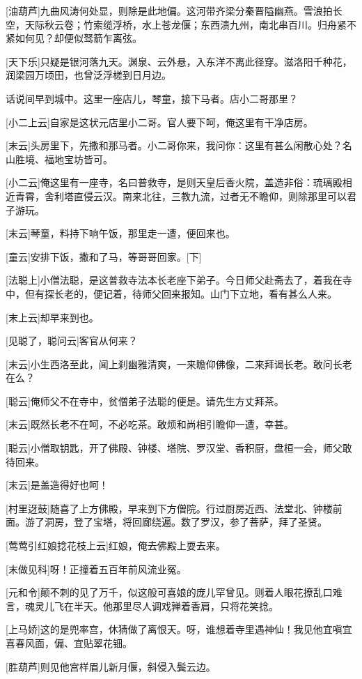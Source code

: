 \documentclass{book}
\begin{document}
[油葫芦]九曲风涛何处显，则除是此地偏。这河带齐梁分秦晋隘幽燕。雪浪拍长空，天际秋云卷；竹索缆浮桥，水上苍龙偃；东西溃九州，南北串百川。归舟紧不紧如何见？却便似驽箭乍离弦。

[天下乐]只疑是银河落九天。渊泉、云外悬，入东洋不离此径穿。滋洛阳千种花，润梁园万顷田，也曾泛浮槎到日月边。

话说间早到城中。这里一座店儿，琴童，接下马者。店小二哥那里？

[小二上云]自家是这状元店里小二哥。官人要下呵，俺这里有干净店房。

[末云]头房里下，先撒和那马者。小二哥你来，我问你：这里有甚么闲散心处？名山胜境、福地宝坊皆可。

[小二云]俺这里有一座寺，名曰普救寺，是则天皇后香火院，盖造非俗：琉璃殿相近青霄，舍利塔直侵云汉。南来北往，三教九流，过者无不瞻仰，则除那里可以君子游玩。

[末云]琴童，料持下响午饭，那里走一遭，便回来也。

[童云]安排下饭，撒和了马，等哥哥回家。[下]

[法聪上]小僧法聪，是这普救寺法本长老座下弟子。今日师父赴斋去了，着我在寺中，但有探长老的，便记着，待师父回来报知。山门下立地，看有甚么人来。

[末上云]却早来到也。

[见聪了，聪问云]客官从何来？

[末云]小生西洛至此，闻上刹幽雅清爽，一来瞻仰佛像，二来拜谒长老。敢问长老在么？

[聪云]俺师父不在寺中，贫僧弟子法聪的便是。请先生方丈拜茶。

[末云]既然长老不在呵，不必吃茶。敢烦和尚相引瞻仰一遭，幸甚。

[聪云]小僧取钥匙，开了佛殿、钟楼、塔院、罗汉堂、香积厨，盘桓一会，师父敢待回来。

[末云]是盖造得好也呵！

[村里迓鼓]随喜了上方佛殿，早来到下方僧院。行过厨房近西、法堂北、钟楼前面。游了洞房，登了宝塔，将回廊绕遍。数了罗汉，参了菩萨，拜了圣贤。

[莺莺引红娘捻花枝上云]红娘，俺去佛殿上耍去来。

[末做见科]呀！正撞着五百年前风流业冤。

[元和令]颠不刺的见了万千，似这般可喜娘的庞儿罕曾见。则着人眼花撩乱口难言，魂灵儿飞在半天。他那里尽人调戏亸着香肩，只将花笑捻。

[上马娇]这的是兜率宫，休猜做了离恨天。呀，谁想着寺里遇神仙！我见他宜嗔宜喜春风面，偏、宜贴翠花钿。

[胜葫芦]则见他宫样眉儿新月偃，斜侵入鬓云边。
\end{document}
